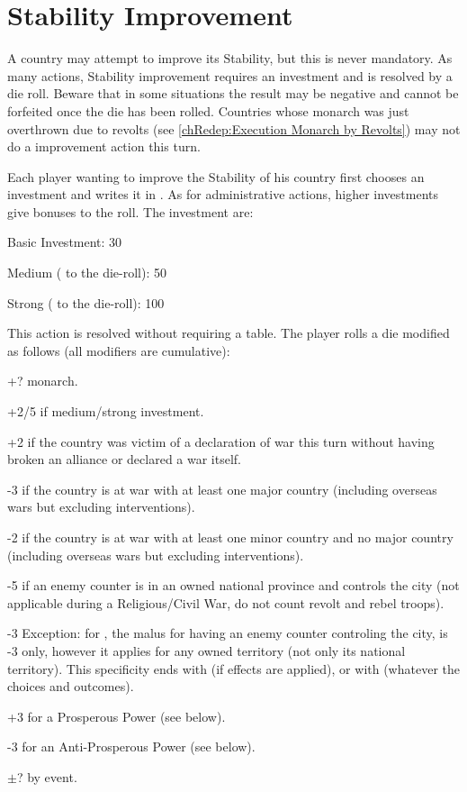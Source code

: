 \section{Stability Improvement}\label{chBudget:Stability Improvement}
\aparag[Stability] A country may attempt to improve its Stability, but this is
never mandatory. As many actions, Stability improvement requires an investment
and is resolved by a die roll. Beware that in some situations the result may
be negative and cannot be forfeited once the die has been rolled.
\bparag Countries whose monarch was just overthrown due to revolts (see
\ref{chRedep:Execution Monarch by Revolts}) may not do a \STAB improvement
action this turn.

\aparag[Investment] Each player wanting to improve the Stability of his
country first chooses an investment and writes it in . As for administrative actions, higher investments give bonuses
to the roll.
\bparag The investment are:
\begin{modlist}
  \item Basic Investment: 30 \ducats
  \item Medium ( to the die-roll): 50 \ducats
  \item Strong ( to the die-roll): 100 \ducats
\end{modlist}

\aparag[Procedure]
This action is resolved without requiring a table.  The player rolls a die
modified as follows (all modifiers are cumulative):
\begin{modlist}
  \item[+?] \ADM monarch.
  \item[+2/5] if medium/strong investment.
  \item[+2] if the country was victim of a declaration of war this turn
    without having broken an alliance or declared a war itself.
  \item[-3] if the country is at war with at least one major country
    (including overseas wars but excluding interventions).
  \item[-2] if the country is at war with at least one minor country and no
    major country (including overseas wars but excluding interventions).
  \item[-5] if an enemy \ARMY counter is in an owned national province and
    controls the city (not applicable during a Religious/Civil War, do not
    count revolt and rebel troops).
  \item[-3] Exception: for \SPA, the malus for having an enemy \ARMY counter
    controling the city, is -3 only, however it applies for any owned
    territory (not only its national territory). This specificity ends with
     (if effects are applied), or with
     (whatever the choices and outcomes).
  \item[+3] for a Prosperous Power (see below).
  \item[-3] for an Anti-Prosperous Power (see below).
  \item[$\pm$?] by event.
\end{modlist}

